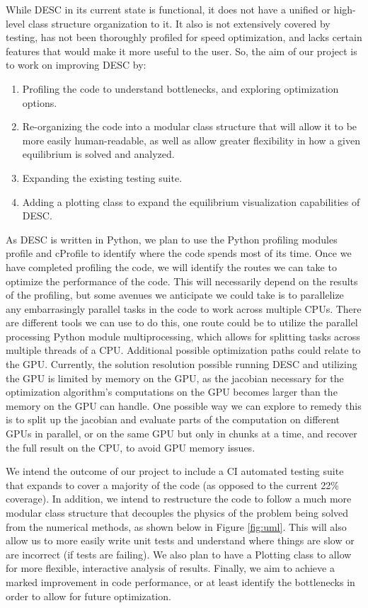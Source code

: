 \documentclass{article}
\begin{document}
While DESC in its current state is functional, it does not have a unified or high-level class structure organization to it.
It also is not extensively covered by testing, has not been thoroughly profiled for speed optimization, and lacks certain features that would make it more useful to the user. So, the aim of our project is to work on improving DESC by:
%
\begin{enumerate}
\item Profiling the code to understand bottlenecks, and exploring optimization options.
\item Re-organizing the code into a modular class structure that will allow it to be more easily human-readable, as well as allow greater flexibility in how a given equilibrium is solved and analyzed.
\item Expanding the existing testing suite.
\item Adding a plotting class to expand the equilibrium visualization capabilities of DESC.
\end{enumerate}
%
As DESC is written in Python, we plan to use the Python profiling modules profile and cProfile to identify where the code spends most of its time. Once we have completed profiling the code, we will identify the routes we can take to optimize the performance of the code. This will necessarily depend on the results of the profiling, but some avenues we anticipate we could take is to parallelize any embarrasingly parallel tasks in the code to work across multiple CPUs. There are different tools we can use to do this, one route could be to utilize the parallel processing Python module multiprocessing, which allows for splitting tasks across multiple threads of a CPU. Additional possible optimization paths could relate to the GPU. Currently, the solution resolution possible running DESC and utilizing the GPU is limited by memory on the GPU, as the jacobian necessary for the optimization algorithm's computations on the GPU becomes larger than the memory on the GPU can handle. One possible way we can explore to remedy this is to split up the jacobian and evaluate parts of the computation on different GPUs in parallel, or on the same GPU but only in chunks at a time, and recover the full result on the CPU, to avoid GPU memory issues.

We intend the outcome of our project to include a CI automated testing suite that expands to cover a majority of the code (as opposed to the current 22\% coverage). In addition, we intend to restructure the code to follow a much more modular class structure that decouples the physics of the problem being solved from the numerical methods, as shown below in Figure \ref{fig:uml}. This will also allow us to more easily write unit tests and understand where things are slow or are incorrect (if tests are failing). We also plan to have a Plotting class to allow for more flexible, interactive analysis of results. Finally, we aim to achieve a marked improvement in code performance, or at least identify the bottlenecks in order to allow for future optimization.
\end{document}

